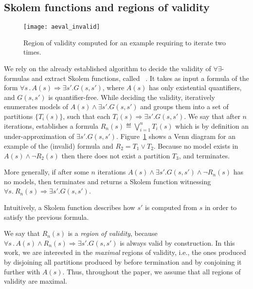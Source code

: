 \subsection{Skolem functions and regions of validity}
\label{sec:aeval}

\begin{figure}[!t]
\centering
\texttt{[image: aeval\_invalid]}
\caption{Region of validity computed for an example requiring \aeval to iterate two times.}
\label{fg:aeval}
\end{figure}


We rely on the already established algorithm to decide the validity of $\forall\exists$-formulas and extract Skolem functions, called \aeval~\cite{fedyukovich2015automated}.
It takes as input a formula of the form $\forall s \,.\,  A(s) \Rightarrow \exists s' . G(s,s')$,
where $A(s)$ has only existential quantifiers, and $G(s,s')$ is quantifier-free.
While deciding the validity, \aeval iteratively enumerates models of
$A(s) \land \exists s'. G(s, s')$ and groups them into a set of partitions $\{T_i(s)\}$, such that each $T_i(s) \Rightarrow \exists s' . G (s, s')$.
We say that after $n$ iterations, \aeval establishes a formula $R_n(s) \eqdef \bigvee_{i=1}^n T_i(s)$ which is by definition an under-approximation of $\exists s' . G (s, s')$.
Figure~\ref{fg:aeval} shows a Venn diagram for an example of the (invalid) formula and $R_2 = T_1 \lor T_2$.
Because no model exists in $A(s) \land \neg{R_2(s)}$ then there does not exist a partition $T_3$, and \aeval terminates.

More generally, if after some $n$ iterations
$A(s) \land \exists s'. G(s, s') \land \neg R_n(s)$ has no models,
then \aeval terminates and returns a Skolem function witnessing
$\forall s.~ R_n(s) \Rightarrow \exists s' .
G(s,s')$.
\iffalse
~\cite{katis2016synthesis}.
\fi 
Intuitively, a Skolem function
describes how $s'$ is computed from $s$ in order to satisfy the
previous formula.

We say that $R_n(s)$ is a \emph{region of validity}, because $\forall s \,.\,  A(s) \land R_n(s) \Rightarrow \exists s' . G(s,s')$ is always valid by construction.
In this work, we are interested in the \emph{maximal} regions of validity, i.e., the ones produced by disjoining all partitions produced by \aeval before termination and by conjoining it further with $A(s)$.
Thus, throughout the paper, we assume that all regions of validity are maximal.

